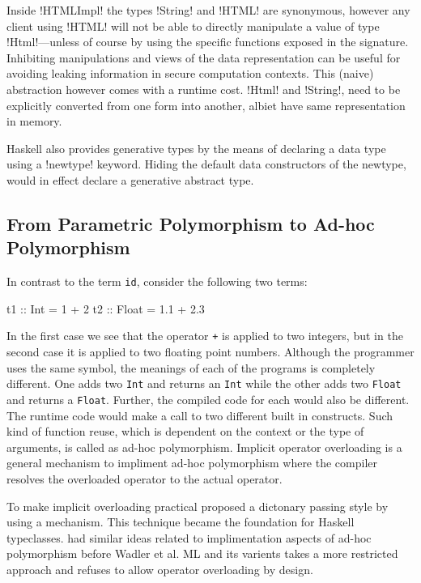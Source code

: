 \documentclass[manuscript,screen,nonacm]{acmart}
\begin{document}
Inside !HTMLImpl! the types !String! and !HTML! are synonymous, however any client using !HTML! will not be able to directly manipulate a value of type !Html!---unless of course by using the specific functions exposed in the signature. Inhibiting manipulations and views of the data representation can be useful for avoiding leaking information in secure computation contexts. This (naive) abstraction however comes with a runtime cost. !Html! and !String!, need to be explicitly converted from one form into another, albiet have same representation in memory.

Haskell also provides generative types by the means of declaring a data type using a !newtype! keyword. Hiding the default data constructors of the newtype, would in effect declare a generative abstract type.

\subsection{From Parametric Polymorphism to Ad-hoc Polymorphism}
In contrast to the term \lstinline{id}, consider the following two terms:
\begin{code}
    t1 :: Int = 1 + 2
    t2 :: Float = 1.1 + 2.3
\end{code}

In the first case we see that the operator \lstinline{+} is applied to two integers, but in the second case it is applied to two floating point numbers. Although the programmer uses the same symbol, the meanings of each of the programs is completely different. One adds two \lstinline{Int} and returns an \lstinline{Int} while the other adds two \lstinline{Float} and returns a \lstinline{Float}. Further, the compiled code for each would also be different. The runtime code would make a call to two different built in constructs. Such kind of function reuse, which is dependent on the context or the type of arguments, is called as ad-hoc polymorphism\cite{strachey_fundamental_2000}. Implicit operator overloading is a general mechanism to impliment ad-hoc polymorphism where the compiler resolves the overloaded operator to the actual operator.

To make implicit overloading practical \citet{wadler_polymorphism_1989} proposed a dictonary passing style by using a mechanism. This technique became the foundation for Haskell\cite{haskell_2010} typeclasses. \cite{kaes_parametric_1988} had similar ideas related to implimentation aspects of ad-hoc polymorphism before Wadler et al. ML and its varients\cite{milner_definition_1997,leroy_ocaml_2023} takes a more restricted approach and refuses to allow operator overloading by design.
\end{document}
